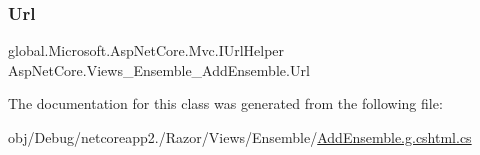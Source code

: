 \mbox{\label{class_asp_net_core_1_1_views___ensemble___add_ensemble_ac908afa73324526a31041d803456fe97}} 
\subsubsection{\texorpdfstring{Url}{Url}}
{\footnotesize\ttfamily global.\+Microsoft.\+Asp\+Net\+Core.\+Mvc.\+I\+Url\+Helper Asp\+Net\+Core.\+Views\+\_\+\+Ensemble\+\_\+\+Add\+Ensemble.\+Url\hspace{0.3cm}{\ttfamily [get]}}



The documentation for this class was generated from the following file\+:\begin{DoxyCompactItemize}
\item 
obj/\+Debug/netcoreapp2./\+Razor/\+Views/\+Ensemble/\mbox{\hyperlink{_add_ensemble_8g_8cshtml_8cs}{Add\+Ensemble.\+g.\+cshtml.\+cs}}\end{DoxyCompactItemize}
